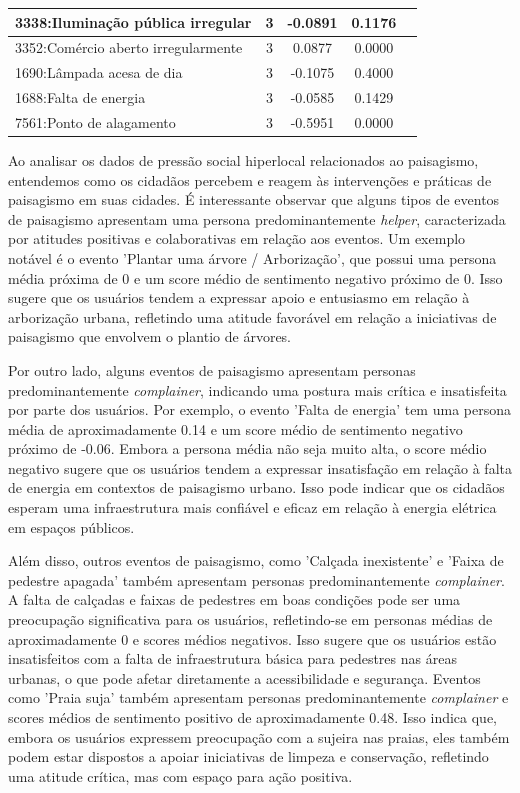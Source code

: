 \begin{table}[htbp]
\begin{tabular}{|l|c|c|c|c|}
		\hline
		3338:Iluminação pública irregular       & 3                & -0.0891        & 0.1176           \\
		\hline
		3352:Comércio aberto irregularmente     & 3                & 0.0877         & 0.0000           \\
		\hline
		1690:Lâmpada acesa de dia               & 3                & -0.1075        & 0.4000           \\
		\hline
		1688:Falta de energia                   & 3                & -0.0585        & 0.1429           \\
		\hline
		7561:Ponto de alagamento                & 3                & -0.5951        & 0.0000           \\
		\hline
	\end{tabular}
\end{table}

Ao analisar os dados de pressão social hiperlocal relacionados ao paisagismo, entendemos como os cidadãos percebem e reagem às intervenções e práticas de paisagismo em suas cidades. É interessante observar que alguns tipos de eventos de paisagismo apresentam uma persona predominantemente \textit{helper}, caracterizada por atitudes positivas e colaborativas em relação aos eventos. Um exemplo notável é o evento 'Plantar uma árvore / Arborização', que possui uma persona média próxima de 0 e um score médio de sentimento negativo próximo de 0. Isso sugere que os usuários tendem a expressar apoio e entusiasmo em relação à arborização urbana, refletindo uma atitude favorável em relação a iniciativas de paisagismo que envolvem o plantio de árvores.

Por outro lado, alguns eventos de paisagismo apresentam personas predominantemente \textit{complainer}, indicando uma postura mais crítica e insatisfeita por parte dos usuários. Por exemplo, o evento 'Falta de energia' tem uma persona média de aproximadamente 0.14 e um score médio de sentimento negativo próximo de -0.06. Embora a persona média não seja muito alta, o score médio negativo sugere que os usuários tendem a expressar insatisfação em relação à falta de energia em contextos de paisagismo urbano. Isso pode indicar que os cidadãos esperam uma infraestrutura mais confiável e eficaz em relação à energia elétrica em espaços públicos.

Além disso, outros eventos de paisagismo, como 'Calçada inexistente' e 'Faixa de pedestre apagada' também apresentam personas predominantemente \textit{complainer}. A falta de calçadas e faixas de pedestres em boas condições pode ser uma preocupação significativa para os usuários, refletindo-se em personas médias de aproximadamente 0 e scores médios negativos. Isso sugere que os usuários estão insatisfeitos com a falta de infraestrutura básica para pedestres nas áreas urbanas, o que pode afetar diretamente a acessibilidade e segurança. Eventos como 'Praia suja' também apresentam personas predominantemente \textit{complainer} e scores médios de sentimento positivo de aproximadamente 0.48. Isso indica que, embora os usuários expressem preocupação com a sujeira nas praias, eles também podem estar dispostos a apoiar iniciativas de limpeza e conservação, refletindo uma atitude crítica, mas com espaço para ação positiva.

